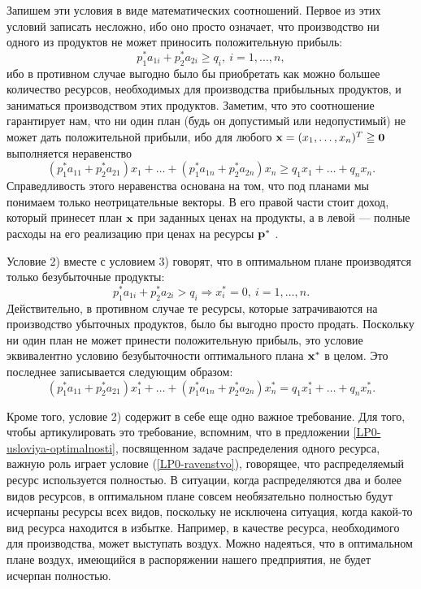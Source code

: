     Запишем эти условия в виде математических
    соотношений. Первое из этих условий записать несложно, ибо оно просто
    означает, что производство ни одного из продуктов
    не может приносить положительную прибыль:
\begin{equation}\label{bezpribilnost}
    p_{1}^{*}a_{1i}+p_{2}^{*}a_{2i}\geqslant q_{i}, \ i=1,\ldots,n,
\end{equation}
    ибо в противном случае выгодно было бы приобретать как можно
    большее количество ресурсов, необходимых для производства
    прибыльных продуктов, и заниматься производством этих продуктов.
    Заметим, что это соотношение гарантирует нам, что ни один план
    (будь он допустимый или недопустимый)
    не может дать положительной прибыли, ибо для любого
    $\mathbf{x}=(x_{1},\ldots,x_{n})^{T}\geqq\mathbf{0}$
     выполняется неравенство
    \[
     (p_{1}^{*}a_{11}+p_{2}^{*}a_{21})x_{1}+\ldots
     +(p_{1}^{*}a_{1n}+p_{2}^{*}a_{2n})x_{n}
     \geqslant q_{1}x_{1}+\ldots+q_{n}x_{n}.
    \]
    Справедливость этого неравенства основана на том, что под
    планами мы понимаем только неотрицательные векторы.
    В его правой части стоит доход, который принесет план
    $\mathbf{x}$ при заданных ценах на продукты,
    а в левой --- полные расходы на его реализацию при ценах на
    ресурсы $\mathbf{p^{*}}$ .



    Условие 2) вместе с  условием 3) говорят, что в оптимальном плане
    производятся только безубыточные продукты:
\begin{equation}\label{dop-nejost1}
        p_{1}^{*}a_{1i}+p_{2}^{*}a_{2i}>q_{i} \Rightarrow
    x_{i}^{*}=0, \ i=1,\ldots,n.
\end{equation}
    Действительно, в противном случае те ресурсы, которые
    затрачиваются на производство убыточных продуктов, было бы
    выгодно просто продать.
    Поскольку ни один план не может принести положительную прибыль,
    это условие эквивалентно условию безубыточности оптимального
    плана $\mathbf{x^{*}}$ в целом. Это последнее записывается
    следующим образом:
\begin{equation}\label{dop-nejost2}
    (p_{1}^{*}a_{11}+p_{2}^{*}a_{21})x_{1}^{*}+\ldots
     +(p_{1}^{*}a_{1n}+p_{2}^{*}a_{2n})x_{n}^{*}
    = q_{1}x_{1}^{*}+\ldots+q_{n}x_{n}^{*}.
\end{equation}



    Кроме того, условие 2) содержит в себе еще одно важное
    требование. Для того, чтобы артикулировать это требование,
    вспомним, что  в предложении \ref{LP0-usloviya-optimalnosti},
    посвященном задаче распределения одного ресурса, важную роль играет условие
    (\ref{LP0-ravenstvo}), говорящее, что распределяемый ресурс
    используется полностью. В ситуации, когда распределяются два и
    более видов ресурсов, в оптимальном плане
    совсем необязательно полностью будут исчерпаны
    ресурсы всех видов, поскольку не исключена ситуация, когда какой-то вид
    ресурса находится в избытке. Например, в качестве ресурса,
    необходимого для производства, может выступать воздух. Можно
    надеяться, что в оптимальном плане воздух, имеющийся в
    распоряжении нашего предприятия, не будет исчерпан полностью.

